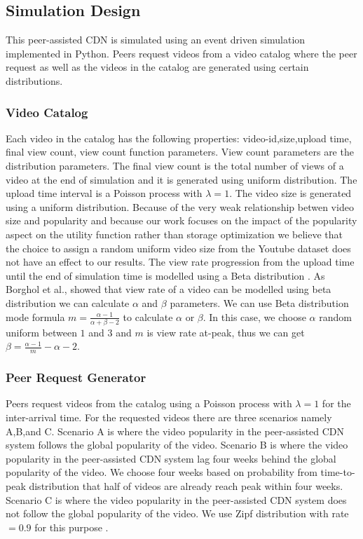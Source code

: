 \subsection{Simulation Design}\label{simulationdesign}
This peer-assisted CDN is simulated using an event driven simulation implemented in Python. 
Peers request videos from a video catalog where the peer request as well as the videos in the catalog are generated using certain distributions.

\subsubsection{Video Catalog}\label{catalog}
Each video in the catalog has the following properties: 
video-id,size,upload time, final view count, view count function parameters. 
View count parameters are the distribution parameters.
The final view count is the total number of views of a video at the end of simulation and it is generated using uniform distribution.
The upload time interval is a Poisson process with $\lambda=1$.
The video size is generated using a uniform distribution.
Because of the very weak relationship betwen video size and popularity \cite{abhari2010workload} and because our work focuses on the impact of the popularity aspect on the utility function rather than storage optimization we believe that the choice to assign a random uniform video size from the Youtube dataset does not have an effect to our results. 
The view rate progression from the upload time until the end of simulation time is modelled using a Beta distribution \cite{Borghol:2011:CMP:2039452.2039717}.
As Borghol et al.,\cite{Borghol:2011:CMP:2039452.2039717} showed that view rate of a video can be modelled using beta distribution we can calculate $\alpha$ and $\beta$ parameters.
We can use Beta distribution mode formula $m=\frac{\alpha-1}{\alpha+\beta-2}$ to calculate $\alpha$ or $\beta$. 
In this case, we choose $\alpha$ random uniform between $1$ and $3$ and $m$ is view rate at-peak, thus we can get $\beta=\frac{\alpha-1}{m}-\alpha-2$.



\subsubsection{Peer Request Generator}\label{peerrequest}
Peers request videos from the catalog using a Poisson process with $\lambda=1$ \cite{Zink:2009:CYN:1502814.1502987} for the inter-arrival time.
For the requested videos there are three scenarios namely A,B,and C.
Scenario A is where the video popularity in the peer-assisted CDN system follows the global popularity of the video.
Scenario B is where the video popularity in the peer-assisted CDN system lag four weeks behind the global popularity of the video. 
We choose four weeks based on probability from time-to-peak distribution that half of videos are already reach peak within four weeks.
Scenario C is where the video popularity in the peer-assisted CDN system does not follow the global popularity of the video. 
We use Zipf distribution with rate$=0.9$ for this purpose \cite{6654887}.


